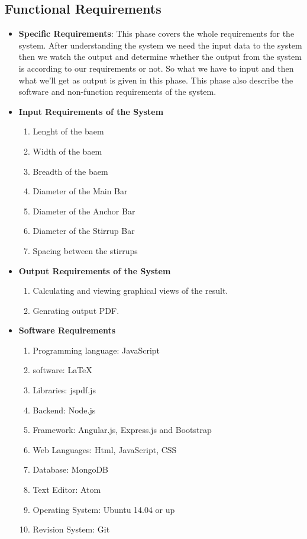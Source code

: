 \subsection{Functional Requirements}
\begin{itemize}
\item {\bf Specific Requirements}: This phase covers the whole requirements 
for the system. After understanding the system we need the input data 
to the system then we watch the output and determine whether the output 
from the system is according to our requirements or not. So what we have 
to input and then what we’ll get as output is given in this phase. This 
phase also describe the software and non-function requirements of the 
system.
\item {\bf Input Requirements of the System}
\begin{enumerate} 
\item Lenght of the baem
\item Width of the baem
\item Breadth of the baem
\item Diameter of the Main Bar
\item Diameter of the Anchor Bar
\item Diameter of the Stirrup Bar
\item Spacing between the stirrups
\end{enumerate}
\vskip 0.5cm
\item {\bf Output Requirements of the System}
\begin{enumerate} 
\item Calculating and viewing graphical views of the result.
\item Genrating output PDF.
\end{enumerate}
\vskip 0.5cm
\item {\bf Software Requirements}
\begin{enumerate} 
\item Programming language: JavaScript
\item software: \LaTeX{}
\item Libraries: jspdf.js
\item Backend: Node.js
\item Framework: Angular.js, Express.js and Bootstrap
\item Web Languages: Html, JavaScript, CSS
\item Database: MongoDB
\item Text Editor: Atom
\item Operating System: Ubuntu 14.04 or up
\item Revision System: Git


\end{enumerate}
\end{itemize}
